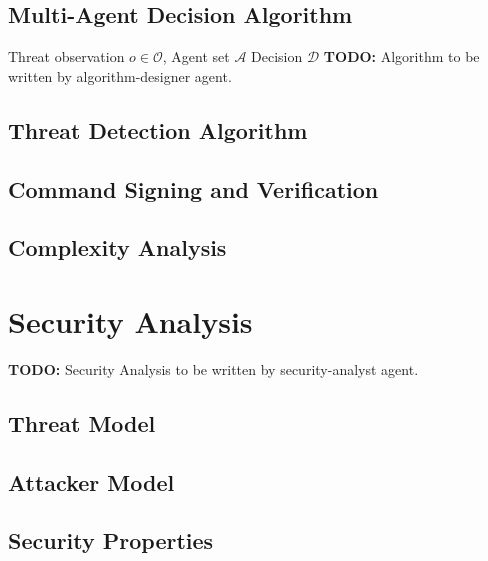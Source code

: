 \documentclass[10pt,journal,compsoc]{IEEEtran}
\newcommand{\agentset}{\mathcal{A}}
\newcommand{\decision}{\mathcal{D}}
\begin{document}
\subsection{Multi-Agent Decision Algorithm}
\label{subsec:decision-algorithm}

\begin{algorithm}
\caption{Multi-Agent Decision Algorithm}
\label{alg:decision}
\begin{algorithmic}[1]
\Require Threat observation $o \in \mathcal{O}$, Agent set $\agentset$
\Ensure Decision $\decision$
\State \textbf{TODO:} Algorithm to be written by algorithm-designer agent.
\end{algorithmic}
\end{algorithm}

\subsection{Threat Detection Algorithm}
\label{subsec:detection-algorithm}

\subsection{Command Signing and Verification}
\label{subsec:signing}

\subsection{Complexity Analysis}
\label{subsec:complexity}

\section{Security Analysis}
\label{sec:security}
\textbf{TODO:} Security Analysis to be written by security-analyst agent.

\subsection{Threat Model}
\label{subsec:threat-model}

\subsection{Attacker Model}
\label{subsec:attacker-model}

\subsection{Security Properties}
\label{subsec:security-properties}
\end{document}
